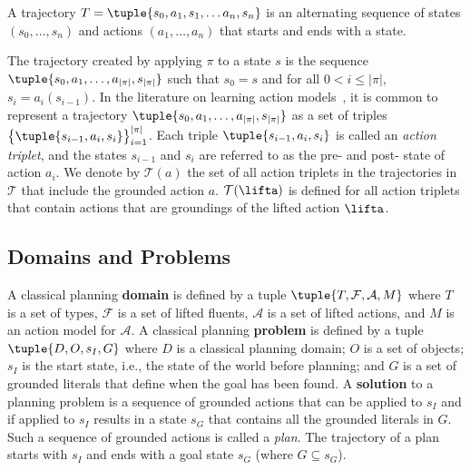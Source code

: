 \begin{definition}[Trajectory]
A trajectory $T=\tuple{s_0, a_1, s_1, \ldots a_n, s_n}$ is an alternating sequence of states $(s_0,\ldots,s_n)$ and actions $(a_1,\ldots,a_n)$ that starts and ends with a state.
\end{definition}
The trajectory created by applying $\pi$ to a state $s$ is 
the sequence $\tuple{s_0, a_1, \ldots, a_{|\pi|}, s_{|\pi|}}$ such that 
$s_0=s$ and for all $0<i\leq |\pi|$, $s_i=a_i(s_{i-1})$. 
In the literature on learning action models~\cite{wang1994learning,wang1995learning,walsh2008efficient,stern2017efficientAndSafe,arora2018review}, 
it is common to represent a trajectory 
$\tuple{s_0, a_1, \ldots, a_{|\pi|}, s_{|\pi|}}$
as a set of triples 
$\big\{\tuple{s_{i-1},a_i,s_i}\big\}_{i=1}^{|\pi|}$.
Each triple $\tuple{s_{i-1},a_i,s_i}$ is called an \emph{action triplet},  and the states $s_{i-1}$ and $s_i$ are referred to as the pre- and post- state of action $a_i$. 
We denote by $\mathcal{T}(a)$ the set of all action triplets in the trajectories in $\mathcal{T}$ that include the grounded action $a$. $\mathcal{T}(\lifta)$ is defined for all action triplets that contain actions that are groundings of the lifted action $\lifta$.  

\subsection{Domains and Problems}

A classical planning \textbf{domain} is defined by a tuple 
$\tuple{T, \mathcal{F}, \mathcal{A}, M}$
where $T$ is a set of types, 
$\mathcal{F}$ is a set of lifted fluents, 
$\mathcal{A}$ is a set of lifted actions, 
and $M$ is an action model for $\mathcal{A}$.
A classical planning \textbf{problem} is defined by a tuple $\tuple{D, O,  s_I, G}$ where $D$ is a classical planning domain;  
$O$ is a set of objects; 
$s_I$ is the start state, i.e., the state of the world before planning;  
and $G$ is a set of grounded literals that define when the goal has been found. 
A \textbf{solution} to a planning problem is a sequence of grounded actions that can be applied to $s_I$ and if applied to $s_I$ results in a state $s_G$ that contains all the grounded literals in $G$. 
Such a sequence of grounded actions is called a \emph{plan}. 
The trajectory of a plan starts with $s_I$ and ends with a goal state $s_G$ (where $G\subseteq s_G$). 









